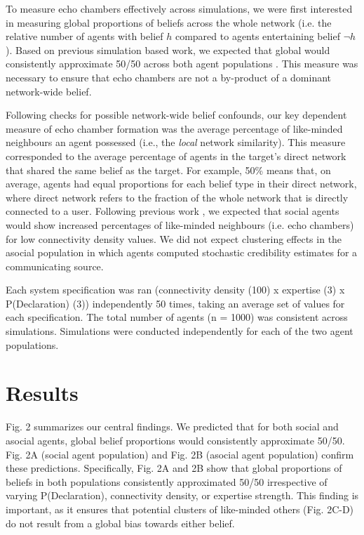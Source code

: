 \documentclass[doc,floatsintext]{apa6}
\begin{document}
To measure echo chambers effectively across simulations, we were first interested in measuring global proportions of beliefs across the whole network (i.e. the relative number of agents with belief \(h\) compared to agents entertaining belief \(\neg h\)). Based on previous simulation based work, we expected that global would consistently approximate 50/50 across both agent populations \citep{pilditch2017opinion}. This measure was necessary to ensure that echo chambers are not a by-product of a dominant network-wide belief. 

Following checks for possible network-wide belief confounds, our key dependent measure of echo chamber formation was the average percentage of like-minded neighbours an agent possessed (i.e., the \textit{local} network similarity). This measure corresponded to the average percentage of agents in the target's direct network that shared the same belief as the target. For example, 50\% means that, on average, agents had equal proportions for each belief type in their direct network, where direct network refers to the fraction of the whole network that is directly connected to a user. Following previous work \citep{pilditch2017opinion}, we expected that social agents would show increased percentages of like-minded neighbours (i.e. echo chambers) for low connectivity density values. We did not expect clustering effects in the asocial population in which agents computed stochastic credibility estimates for a communicating source.

Each system specification was ran (connectivity density (100) x expertise (3) x P(Declaration) (3)) independently 50 times, taking an average set of values for each specification. The total number of agents (n = 1000) was consistent across simulations. Simulations were conducted independently for each of the two agent populations.

\section{Results}
Fig. 2 summarizes our central findings. We predicted that for both social and asocial agents, global belief proportions would consistently approximate 50/50. Fig. 2A (social agent population) and Fig. 2B (asocial agent population) confirm these predictions. Specifically, Fig. 2A and 2B show that global proportions of beliefs in both populations consistently approximated 50/50 irrespective of varying P(Declaration), connectivity density, or expertise strength. This finding is important, as it ensures that potential clusters of like-minded others (Fig. 2C-D) do not result from a global bias towards either belief.
\end{document}
